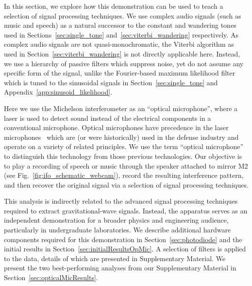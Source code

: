 \documentclass[paper-main.tex]{subfiles}
\begin{document}
In this section, we explore how this demonstration can be used to teach a selection of signal processing techniques. 
We use complex audio signals (such as music and speech) as a natural successor to the constant and wandering tones used in Sections~\ref{sec:single_tone} and~\ref{sec:viterbi_wandering} respectively.
As complex audio signals are not quasi-monochromatic, the Viterbi algorithm as used in Section~\ref{sec:viterbi_wandering} is not directly applicable here. 
Instead, we use a hierarchy of passive filters which suppress noise, yet do not assume any specific form of the signal, unlike the Fourier-based maximum likelihood filter which is tuned to the sinusoidal signals in Section~\ref{sec:single_tone} and Appendix~\ref{app:sinusoid_likelihood}.

Here we use the Michelson interferometer as an ``optical microphone'', where a laser is used to detect sound instead of the electrical components in a conventional microphone.
Optical microphones have precedence in the laser microphones~\cite{laser_microphone} which are (or were historically) used in the defense industry and operate on a variety of related principles. We use the term ``optical microphone'' to distinguish this technology from those previous technologies.
Our objective is to play a recording of speech or music through the speaker attached to mirror M2 (see Fig.~\ref{fig:ifo_schematic_webcam}), record the resulting interference pattern, and then recover the original signal via a selection of signal processing techniques. 


This analysis is indirectly related to the advanced signal processing techniques required to extract gravitational-wave signals. 
Instead, the apparatus serves as an independent demonstration for a broader physics and engineering audience, particularly in undergraduate laboratories. 
We describe additional hardware components required for this demonstration in Section~\ref{sec:photodiode} and the initial results in Section~\ref{sec:initialResultsOpMic}. 
A selection of filters is applied to the data, details of which are presented in Supplementary Material. 
We present the two best-performing analyses from our Supplementary Material in Section~\ref{sec:opticalMicResults}. 
\end{document}
